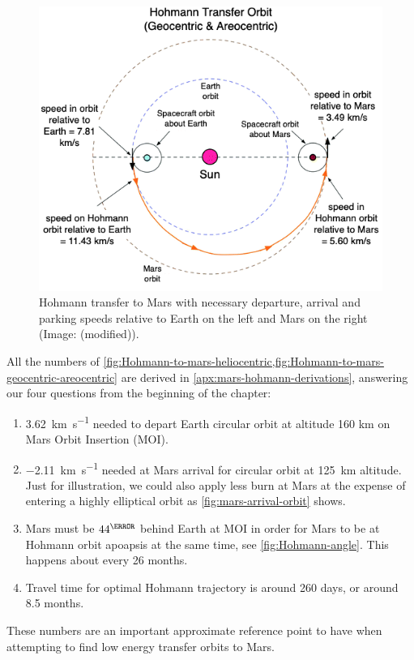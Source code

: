 \begin{figure}[ht]
    \centering
    \includegraphics[width=0.7\linewidth]{fig/Hohmann-to-mars-geocentric-areocentric.png}
    \caption{Hohmann transfer to Mars with necessary departure, arrival and parking speeds relative to Earth on the left and Mars on the right (Image: \cite[p.~133]{Rapp2016} (modified)).}
    \label{fig:Hohmann-to-mars-geocentric-areocentric}
\end{figure}

All the numbers of \cref{fig:Hohmann-to-mars-heliocentric,fig:Hohmann-to-mars-geocentric-areocentric} are derived in \cref{apx:mars-hohmann-derivations}, answering our four questions from the beginning of the chapter:

\begin{enumerate}
	\item \SI{3.62}{\km\per\s} needed to depart Earth circular orbit at altitude 160 km on Mars Orbit Insertion (MOI).
	\item \SI{-2.11}{\km\per\s} needed at Mars arrival for circular orbit at \SI{125}{\km} altitude. Just for illustration, we could also apply less burn at Mars at the expense of entering a highly elliptical orbit as \cref{fig:mars-arrival-orbit} shows.
	\item Mars must be $44^\degree$ behind Earth at MOI in order for Mars to be at Hohmann orbit apoapsis at the same time, see \cref{fig:Hohmann-angle}. This happens about every 26 months.
	\item Travel time for optimal Hohmann trajectory is around 260 days, or around 8.5 months.
\end{enumerate}

These numbers are an important approximate reference point to have when attempting to find low energy transfer orbits to Mars.

